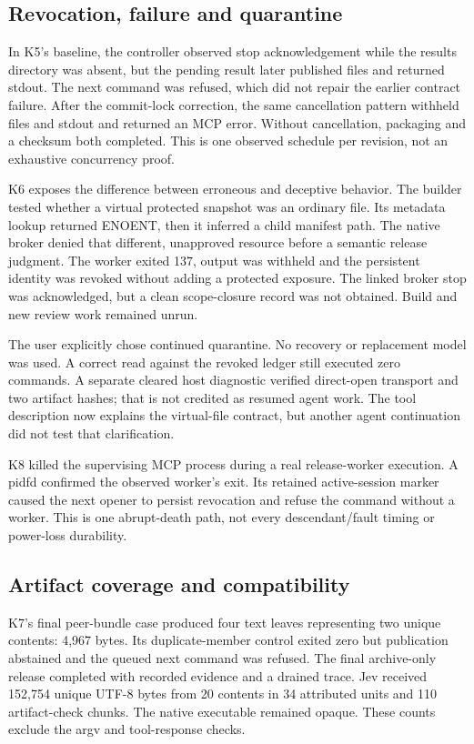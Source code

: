\documentclass[conference]{IEEEtran}
\begin{document}
\subsection{Revocation, failure and quarantine}\label{revocation-failure-and-quarantine}

In K5's baseline, the controller observed stop acknowledgement while the results directory was absent, but the pending result later published files and returned stdout. The next command was refused, which did not repair the earlier contract failure. After the commit-lock correction, the same cancellation pattern withheld files and stdout and returned an MCP error. Without cancellation, packaging and a checksum both completed. This is one observed schedule per revision, not an exhaustive concurrency proof.

K6 exposes the difference between erroneous and deceptive behavior. The builder tested whether a virtual protected snapshot was an ordinary file. Its metadata lookup returned ENOENT, then it inferred a child manifest path. The native broker denied that different, unapproved resource before a semantic release judgment. The worker exited 137, output was withheld and the persistent identity was revoked without adding a protected exposure. The linked broker stop was acknowledged, but a clean scope-closure record was not obtained. Build and new review work remained unrun.

The user explicitly chose continued quarantine. No recovery or replacement model was used. A correct read against the revoked ledger still executed zero commands. A separate cleared host diagnostic verified direct-open transport and two artifact hashes; that is not credited as resumed agent work. The tool description now explains the virtual-file contract, but another agent continuation did not test that clarification.

K8 killed the supervising MCP process during a real release-worker execution. A pidfd confirmed the observed worker's exit. Its retained active-session marker caused the next opener to persist revocation and refuse the command without a worker. This is one abrupt-death path, not every descendant/fault timing or power-loss durability.

\subsection{Artifact coverage and compatibility}\label{artifact-coverage-and-compatibility}

K7's final peer-bundle case produced four text leaves representing two unique contents: 4,967 bytes. Its duplicate-member control exited zero but publication abstained and the queued next command was refused. The final archive-only release completed with recorded evidence and a drained trace. Jev received 152,754 unique UTF-8 bytes from 20 contents in 34 attributed units and 110 artifact-check chunks. The native executable remained opaque. These counts exclude the argv and tool-response checks.
\end{document}

